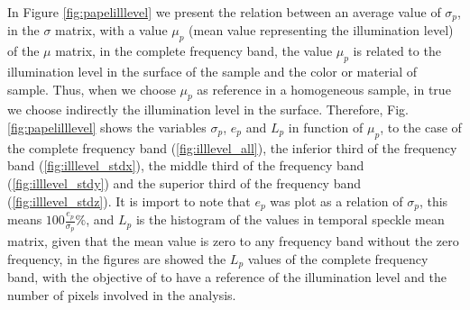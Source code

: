 \documentclass[review]{elsarticle}
\begin{document}
In Figure \ref{fig:papelilllevel} we present the relation between an average value of $\sigma_p$,
in the $\sigma$ matrix, with a value $\mu_p$ (mean value representing the illumination level) of the $\mu$ matrix, 
in the complete frequency band, the value $\mu_p$
is related to the illumination level in the surface of the sample \cite{Nothdurft:05}
and the color or material of sample. Thus, when we choose $\mu_p$  as reference 
in a homogeneous sample,  
in true we choose indirectly the illumination level in the surface.
Therefore, Fig. \ref{fig:papelilllevel} shows the variables $\sigma_p$, $e_p$ and $L_p$ in function
of  $\mu_p$, to the case of the complete frequency band (\ref{fig:illlevel_all}), the inferior third of the frequency band (\ref{fig:illlevel_stdx}),
the middle third of the frequency band (\ref{fig:illlevel_stdy}) and the superior third of the frequency band (\ref{fig:illlevel_stdz}). It is import to note that $e_p$ was plot as a relation of $\sigma_p$, this means  $100 \frac{e_p}{\sigma_p} \%$,
and $L_p$ is the histogram of the values in temporal speckle mean matrix, 
given that the mean value is zero to any frequency band without the zero frequency,
in the figures are showed the $L_p$ values of the complete frequency band, 
with the objective of to have a reference of the illumination level and the number of pixels involved in the analysis.
\end{document}

